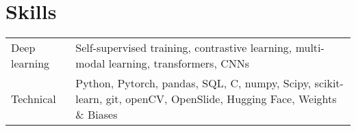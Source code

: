 \documentclass[a4paper,12pt]{article}
\begin{document}

\enlargethispage{3\baselineskip}

\section{Skills}
\begin{tabularx}{\linewidth}{@{}l X@{}}
Deep learning & \normalsize{Self-supervised training, contrastive learning, multi-modal learning, transformers, CNNs}\\
Technical &  \normalsize{Python, Pytorch, pandas, SQL, C, numpy, Scipy, scikit-learn, git, openCV, OpenSlide, Hugging Face, Weights \& Biases} 
\end{tabularx}


{}
\end{document}
